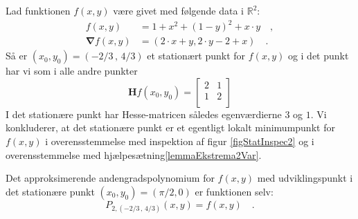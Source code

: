 \begin{example} \label{exampStatInspec2}
Lad funktionen $f(x,y)$ være givet med følgende data i $\mathbb{R}^{2}$:
\begin{equation}
\begin{aligned}
f(x,y) &= 1+ x^{2} + (1-y)^{2} + x\cdot y \quad , \\
\bm{\nabla}f(x,y) &=  (2\cdot x + y, 2\cdot y -2 + x)  \quad .
\end{aligned}
\end{equation}
Så er $(x_{0}, y_{0}) = (-2/3 \, , \, 4/3) $ et stationært punkt for $f(x,y)$ og i det punkt har vi som i alle andre punkter
\begin{equation}
\bm{H}f(x_{0},y_{0}) = \left[
                                                                           \begin{array}{cc}
                                                                             2 & 1 \\
                                                                             1 & 2\\
                                                                           \end{array}
                                                                         \right]
\end{equation}
I det stationære punkt har Hesse-matricen således egenværdierne $3$ og $1$. Vi konkluderer, at det stationære punkt er et egentligt lokalt minimumpunkt for $f(x,y)$ i overensstemmelse med inspektion af figur \ref{figStatInspec2} og i overensstemmelse med hjælpesætning\ref{lemmaEkstrema2Var}.

Det approksimerende andengradspolynomium for $f(x,y)$ med udviklingspunkt i det stationære punkt $(x_{0}, y_{0})= (\pi/2, 0)$ er funktionen selv:
\begin{equation}
P_{2, (-2/3 \, , \, 4/3)}(x,y) =   f(x,y)      \quad.
\end{equation}
\end{example}

